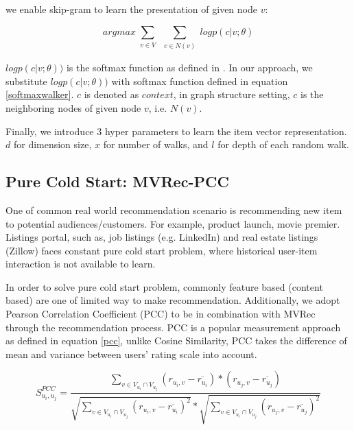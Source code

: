 we enable skip-gram to learn the presentation of given node $v$:

\begin{equation}\label{skipgram}
    arg max
    \sum\limits_{\substack{v \in V}}
    \sum\limits_{\substack{c \in N(v)}}
    log p({c|v;\theta})
\end{equation}

$log p({c|v;\theta}))$ is the softmax function as defined in \cite{mikolov2013distributed} \cite{mikolov2013efficient}. In our approach, we substitute $log p({c|v;\theta}))$ with softmax function defined in equation \ref{softmaxwalker}. $c$ is denoted as $context$, in graph structure setting, $c$ is the neighboring nodes of given node $v$, i.e. $N(v)$. 

Finally, we introduce 3 hyper parameters to learn the item vector representation. $d$ for dimension size, $x$ for number of walks, and $l$ for depth of each random walk. 


\subsection{Pure Cold Start: MVRec-PCC}\label{3PCC}
One of common real world recommendation scenario is recommending new item to potential audiences/customers. For example, product launch, movie premier. Listings portal, such as, job listings (e.g. LinkedIn) and real estate listings (Zillow) faces constant pure cold start problem, where historical user-item interaction is not available to learn. 

In order to solve pure cold start problem, commonly feature based (content based) are one of limited way to make recommendation. 
Additionally, we adopt Pearson Correlation Coefficient (PCC) to be in combination with MVRec through the recommendation process. 
PCC is a popular measurement approach as defined in equation \ref{pcc}, unlike Cosine Similarity, PCC takes the difference of mean and variance between users' rating scale into account.

\begin{strip}
    \begin{equation}\label{pcc}
        S_{u_i,u_j}^{PCC} = 
        \dfrac{
            \sum_{v \in V_{u_i} \cap V_{u_j}} (r_{u_i,v}-\overline{r_{u_i}}) 
            * 
            (r_{u_j,v} - \overline{r_{u_j}})
        }
        {
            \sqrt{\sum_{v \in V_{u_i} \cap V_{u_j}} (r_{u_i,v}-\overline{r_{u_i}})^2} 
            * 
            \sqrt{\sum_{v \in V_{u_i} \cap V_{u_j}} (r_{u_j,v}-\overline{r_{u_j}})^2}
        }
    \end{equation}
\end{strip}

